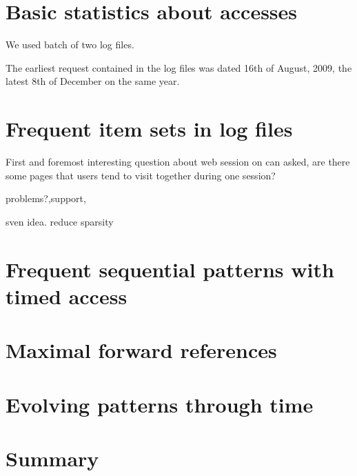 \documentclass[english,a4paper]{article}
\begin{document}
\section{Basic statistics about accesses}
We used batch of two log files.

The earliest request contained in the log files was dated 16th of August, 2009, the latest 8th of December on the same year. 

\section{Frequent item sets in log files}
First and foremost interesting question about web session on can asked, are there some pages that users tend to visit together during one session?

problems?,support, 

sven idea. reduce sparsity


\section{Frequent sequential patterns with timed access}

\section{Maximal forward references}

\section{Evolving patterns through time}

\section{Summary}
\end{document}
